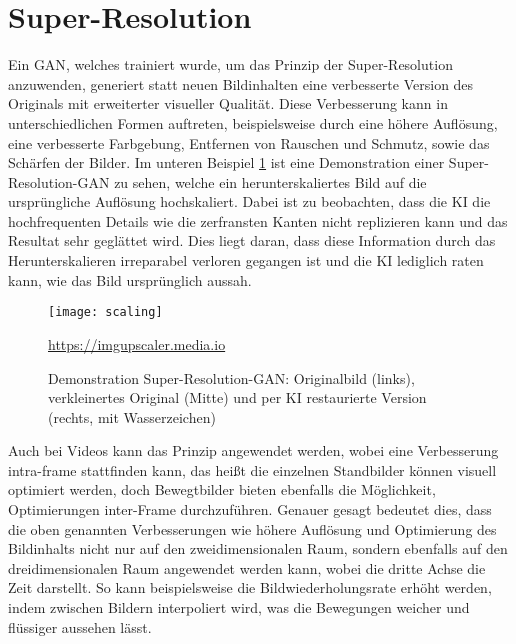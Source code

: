 \section{Super-Resolution}

\noindent Ein \ac{GAN}, welches trainiert wurde, um das Prinzip der Super-Resolution anzuwenden, generiert statt neuen Bildinhalten eine verbesserte Version des Originals mit erweiterter visueller Qualität. Diese Verbesserung kann in unterschiedlichen Formen auftreten, beispielsweise durch eine höhere Auflösung, eine verbesserte Farbgebung, Entfernen von Rauschen und Schmutz, sowie das Schärfen der Bilder. Im unteren Beispiel \ref{fig:scaling} ist eine Demonstration einer Super-Resolution-GAN zu sehen, welche ein herunterskaliertes Bild auf die ursprüngliche Auflösung hochskaliert. Dabei ist zu beobachten, dass die KI die hochfrequenten Details wie die zerfransten Kanten nicht replizieren kann und das Resultat sehr geglättet wird. Dies liegt daran, dass diese Information durch das Herunterskalieren irreparabel verloren gegangen ist und die KI lediglich raten kann, wie das Bild ursprünglich aussah.\\


\begin{figure}[H]
    \centering
    \texttt{[image: scaling]}
    \caption{Demonstration Super-Resolution-GAN: Originalbild (links), verkleinertes Original (Mitte) und per KI restaurierte Version (rechts, mit Wasserzeichen)} \quelle\url{https://imgupscaler.media.io}
\label{fig:scaling}
\end{figure}


\noindent Auch bei Videos kann das Prinzip angewendet werden, wobei eine Verbesserung intra-frame stattfinden kann, das heißt die einzelnen Standbilder können visuell optimiert werden, doch Bewegtbilder bieten ebenfalls die Möglichkeit, Optimierungen inter-Frame durchzuführen. Genauer gesagt bedeutet dies, dass die oben genannten Verbesserungen wie höhere Auflösung und Optimierung des Bildinhalts nicht nur auf den zweidimensionalen Raum, sondern ebenfalls auf den dreidimensionalen Raum angewendet werden kann, wobei die dritte Achse die Zeit darstellt. So kann beispielsweise die Bildwiederholungsrate erhöht werden, indem zwischen Bildern interpoliert wird, was die Bewegungen weicher und flüssiger aussehen lässt.
\newpage